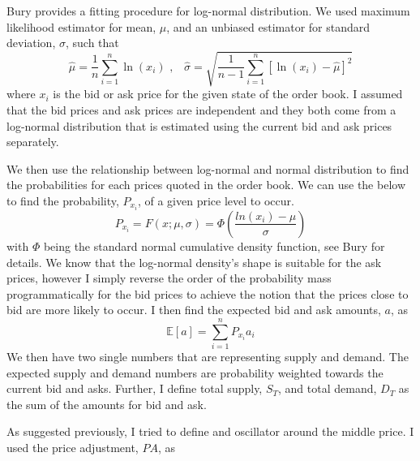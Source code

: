\documentclass[12pt]{article}
\begin{document}
Bury \cite{bury} provides a fitting procedure for log-normal distribution. We used maximum likelihood estimator for mean, $\mu$, and an unbiased estimator for standard deviation, $\sigma$, such that
\[
	\hat{\mu} = \frac{1}{n} \sum_{i=1}^{n} \ln{(x_i)} \text{  ,} \quad \hat{\sigma} = \sqrt{\frac{1}{n-1} \sum_{i=1}^{n} [\ln{(x_i)} - \hat{\mu}]^2 }
\]
where $x_i$ is the bid or ask price for the given state of the order book. I assumed that the bid prices and ask prices are independent and they both come from a log-normal distribution that is estimated using the current bid and ask prices separately.

We then use the relationship between log-normal and normal distribution to find the probabilities for each prices quoted in the order book. We can use the below to find the probability,  $P_{x_i}$, of a given price level to occur.
\[
	P_{x_i} = F(x; \mu, \sigma) = \Phi \left( \frac{ln{(x_i)} - \mu}{\sigma} \right)
\]
with $\Phi$ being the standard normal cumulative density function, see Bury \cite{bury} for details. We know that the log-normal density's shape is suitable for the ask prices, however I simply reverse the order of the probability mass programmatically for the bid prices to achieve the notion that the prices close to bid are more likely to occur. I then find the expected bid and ask amounts, $a$, as
\[
	\mathbb{E}[a] = \sum_{i=1}^{n} P_{x_i} a_i
\]
We then have two single numbers that are representing supply and demand. The expected supply and demand numbers are probability weighted towards the current bid and asks. Further, I define total supply, $S_T$, and total demand, $D_T$ as the sum of the amounts for bid and ask.

As suggested previously, I tried to define and oscillator around the middle price. I used the price adjustment, $PA$, as
\end{document}
